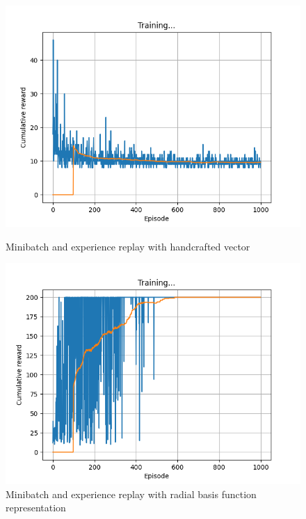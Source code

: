 \documentclass[12pt]{article}
\begin{document}
\begin{figure}[H]
    \centering
   \begin{minipage}{0.48\textwidth}
     \centering
     \includegraphics[width=0.9\linewidth]{exercise-4/plots/task-2a.png}
     \caption{Minibatch and experience replay with handcrafted vector}
     \label{fig:task-2-1}
   \end{minipage}\hfill
   \begin{minipage}{0.48\textwidth}
     \centering
     \includegraphics[width=0.9\linewidth]{exercise-4/plots/task-2b.png}
     \caption{Minibatch and experience replay with radial basis function representation}
     \label{fig:task-2-2}
   \end{minipage}
\end{figure}


\end{document}
